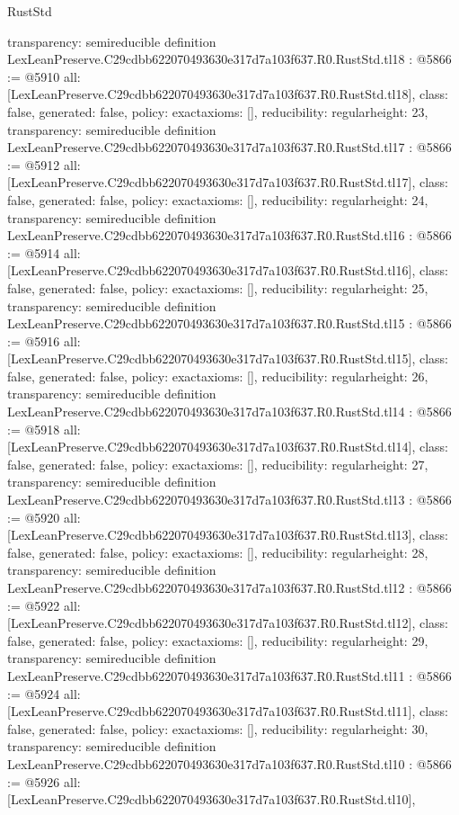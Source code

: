 \begin{lexlean}{RustStd}
\begin{coremodule}
{  transparency: semireducible
}
definition LexLeanPreserve.C29cdbb622070493630e317d7a103f637.R0.RustStd.tl18 : @5866 := @5910 {
  all: [LexLeanPreserve.C29cdbb622070493630e317d7a103f637.R0.RustStd.tl18],
  class: false,
  generated: false,
  policy: exact{axioms: []},
  reducibility: regular{height: 23},
  transparency: semireducible
}
definition LexLeanPreserve.C29cdbb622070493630e317d7a103f637.R0.RustStd.tl17 : @5866 := @5912 {
  all: [LexLeanPreserve.C29cdbb622070493630e317d7a103f637.R0.RustStd.tl17],
  class: false,
  generated: false,
  policy: exact{axioms: []},
  reducibility: regular{height: 24},
  transparency: semireducible
}
definition LexLeanPreserve.C29cdbb622070493630e317d7a103f637.R0.RustStd.tl16 : @5866 := @5914 {
  all: [LexLeanPreserve.C29cdbb622070493630e317d7a103f637.R0.RustStd.tl16],
  class: false,
  generated: false,
  policy: exact{axioms: []},
  reducibility: regular{height: 25},
  transparency: semireducible
}
definition LexLeanPreserve.C29cdbb622070493630e317d7a103f637.R0.RustStd.tl15 : @5866 := @5916 {
  all: [LexLeanPreserve.C29cdbb622070493630e317d7a103f637.R0.RustStd.tl15],
  class: false,
  generated: false,
  policy: exact{axioms: []},
  reducibility: regular{height: 26},
  transparency: semireducible
}
definition LexLeanPreserve.C29cdbb622070493630e317d7a103f637.R0.RustStd.tl14 : @5866 := @5918 {
  all: [LexLeanPreserve.C29cdbb622070493630e317d7a103f637.R0.RustStd.tl14],
  class: false,
  generated: false,
  policy: exact{axioms: []},
  reducibility: regular{height: 27},
  transparency: semireducible
}
definition LexLeanPreserve.C29cdbb622070493630e317d7a103f637.R0.RustStd.tl13 : @5866 := @5920 {
  all: [LexLeanPreserve.C29cdbb622070493630e317d7a103f637.R0.RustStd.tl13],
  class: false,
  generated: false,
  policy: exact{axioms: []},
  reducibility: regular{height: 28},
  transparency: semireducible
}
definition LexLeanPreserve.C29cdbb622070493630e317d7a103f637.R0.RustStd.tl12 : @5866 := @5922 {
  all: [LexLeanPreserve.C29cdbb622070493630e317d7a103f637.R0.RustStd.tl12],
  class: false,
  generated: false,
  policy: exact{axioms: []},
  reducibility: regular{height: 29},
  transparency: semireducible
}
definition LexLeanPreserve.C29cdbb622070493630e317d7a103f637.R0.RustStd.tl11 : @5866 := @5924 {
  all: [LexLeanPreserve.C29cdbb622070493630e317d7a103f637.R0.RustStd.tl11],
  class: false,
  generated: false,
  policy: exact{axioms: []},
  reducibility: regular{height: 30},
  transparency: semireducible
}
definition LexLeanPreserve.C29cdbb622070493630e317d7a103f637.R0.RustStd.tl10 : @5866 := @5926 {
  all: [LexLeanPreserve.C29cdbb622070493630e317d7a103f637.R0.RustStd.tl10],
}
\end{coremodule}
\end{lexlean}
